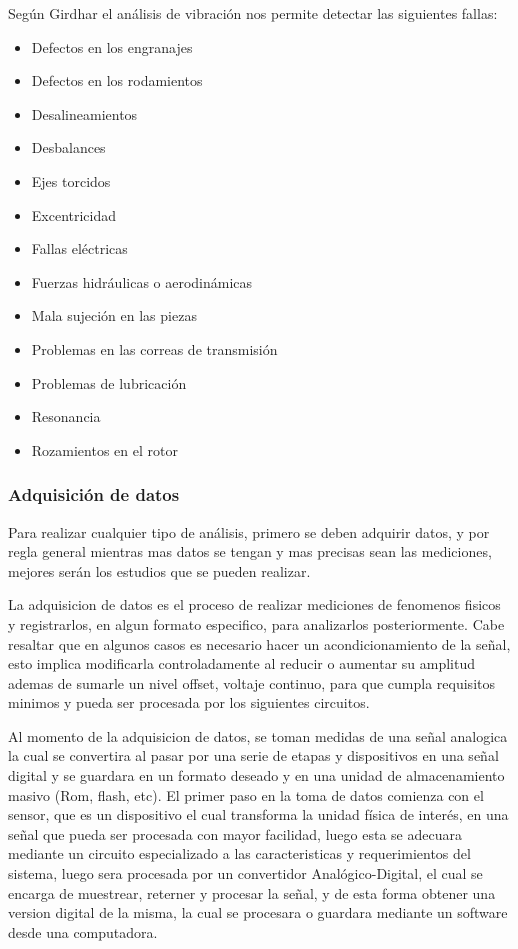 Según Girdhar \Cite{Girdhar}  el análisis de vibración nos permite detectar las
siguientes fallas:

\begin{itemize}
\item Defectos en los engranajes
\item Defectos en los rodamientos
\item Desalineamientos
\item Desbalances
\item Ejes torcidos
\item Excentricidad
\item Fallas eléctricas
\item Fuerzas hidráulicas o aerodinámicas
\item Mala sujeción en las piezas
\item Problemas en las correas de transmisión
\item Problemas de lubricación
\item Resonancia
\item Rozamientos en el rotor
\end{itemize}


\subsubsection*{Adquisición de datos}

Para realizar cualquier tipo de análisis, primero se deben adquirir datos, y
por regla general mientras mas datos se tengan y mas precisas sean las
mediciones, mejores serán los estudios que se pueden realizar.

La adquisicion de datos es el proceso de realizar mediciones de fenomenos fisicos
y registrarlos, en algun formato especifico, para analizarlos posteriormente.
Cabe resaltar que en algunos casos es necesario hacer un acondicionamiento de
la señal, esto
implica modificarla controladamente al reducir o aumentar su amplitud ademas de
sumarle un nivel offset, voltaje continuo, para que cumpla requisitos minimos
y pueda ser procesada por los siguientes circuitos.

Al momento de la adquisicion de datos, se toman medidas de una señal analogica
la cual se convertira al pasar por una serie de etapas y dispositivos en una
señal digital y se guardara en un formato deseado y en una unidad de
almacenamiento masivo (Rom, flash, etc).
El primer paso en la toma de  datos comienza con el sensor, que es un
dispositivo el cual transforma la unidad física de interés, en una señal que
pueda ser procesada con mayor facilidad, luego esta se adecuara mediante un
circuito especializado a las caracteristicas y requerimientos del sistema,
luego sera procesada por un convertidor Analógico-Digital, el cual se encarga de
muestrear, reterner y procesar la señal, y de esta forma obtener una version
digital de la misma, la cual se procesara o guardara mediante un software desde
una computadora.

